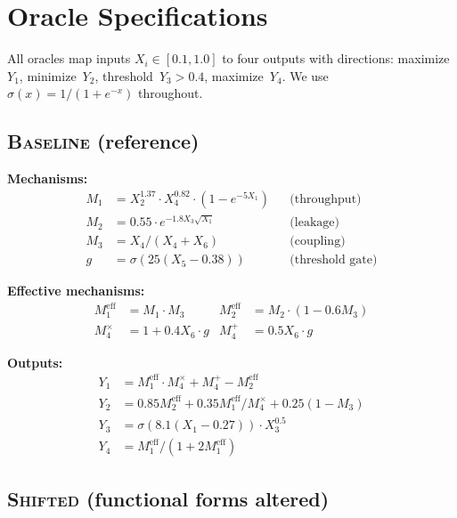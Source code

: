 \documentclass[11pt,letterpaper]{article}
\newcommand{\oracle}[1]{\textsc{#1}}
\newcommand{\baseline}{\oracle{Baseline}}
\newcommand{\shifted}{\oracle{Shifted}}
\begin{document}
\clearpage
\appendix

\section{Oracle Specifications}
\label{app:oracle_specs}

All oracles map inputs $X_i \in [0.1, 1.0]$ to four outputs with
directions: maximize~$Y_1$, minimize~$Y_2$, threshold~$Y_3 > 0.4$,
maximize~$Y_4$. We use $\sigma(x) = 1/(1 + e^{-x})$ throughout.

\subsection{\baseline{} (reference)}

\textbf{Mechanisms:}
\begin{align*}
  M_1 &= X_2^{1.37} \cdot X_4^{0.82} \cdot (1 - e^{-5X_1})
    & &\text{(throughput)} \\
  M_2 &= 0.55 \cdot e^{-1.8 X_3 \sqrt{X_1}}
    & &\text{(leakage)} \\
  M_3 &= X_4 / (X_4 + X_6)
    & &\text{(coupling)} \\
  g &= \sigma(25(X_5 - 0.38))
    & &\text{(threshold gate)}
\end{align*}

\textbf{Effective mechanisms:}
\begin{align*}
  M_1^{\text{eff}} &= M_1 \cdot M_3 &
  M_2^{\text{eff}} &= M_2 \cdot (1 - 0.6 M_3) \\
  M_4^{\times} &= 1 + 0.4 X_6 \cdot g &
  M_4^{+} &= 0.5 X_6 \cdot g
\end{align*}

\textbf{Outputs:}
\begin{align*}
  Y_1 &= M_1^{\text{eff}} \cdot M_4^{\times} + M_4^{+}
         - M_2^{\text{eff}} \\
  Y_2 &= 0.85 M_2^{\text{eff}}
         + 0.35 M_1^{\text{eff}} / M_4^{\times}
         + 0.25(1 - M_3) \\
  Y_3 &= \sigma(8.1(X_1 - 0.27)) \cdot X_3^{0.5} \\
  Y_4 &= M_1^{\text{eff}} / (1 + 2 M_1^{\text{eff}})
\end{align*}

\subsection{\shifted{} (functional forms altered)}
\end{document}
